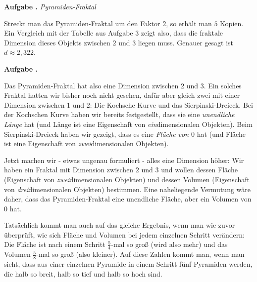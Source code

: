 \documentclass[a4paper,ngerman,12pt]{scrartcl}
\theoremstyle{definition}
\theoremstyle{plain}
\theoremstyle{remark}
\newlength{\aufgabenskip}
\newcounter{aufgabennummer}
\newenvironment{aufgabe}[1]{
  \addtocounter{aufgabennummer}{1}
  \textbf{Aufgabe \theaufgabennummer.} \emph{#1} \par
}{\vspace{\aufgabenskip}}
\begin{document}
\begin{aufgabe}{Pyramiden-Fraktal}
	Streckt man das Pyramiden-Fraktal um den Faktor $2$, so erhält man $5$ Kopien. Ein Vergleich mit der Tabelle aus Aufgabe 3 zeigt also, dass die fraktale Dimension dieses Objekts zwischen $2$ und $3$ liegen muss. Genauer gesagt ist $d \approx 2,322$.
\end{aufgabe}
	
\begin{aufgabe}{}
	Das Pyramiden-Fraktal hat also eine Dimension zwischen $2$ und $3$. Ein solches Fraktal hatten wir bisher noch nicht gesehen, dafür aber gleich zwei mit einer Dimension zwischen $1$ und $2$: Die Kochsche Kurve und das Sierpinski-Dreieck. Bei der Kochschen Kurve haben wir bereits festgestellt, dass sie eine \emph{unendliche Länge} hat (und Länge ist eine Eigenschaft von \emph{ein}dimensionalen Objekten). Beim Sierpinski-Dreieck haben wir gezeigt, dass es eine \emph{Fläche von $0$} hat (und Fläche ist eine Eigenschaft von \emph{zwei}dimensionalen Objekten).
	
	Jetzt machen wir - etwas ungenau formuliert - \glqq alles eine Dimension höher\grqq: Wir haben ein Fraktal mit Dimension zwischen $2$ und $3$ und wollen dessen Fläche (Eigenschaft von \emph{zwei}dimensionalen Objekten) und dessen Volumen (Eigenschaft von \emph{drei}dimensionalen Objekten) bestimmen. Eine naheliegende Vermutung wäre daher, dass das Pyramiden-Fraktal eine unendliche Fläche, aber ein Volumen von $0$ hat.
	
	Tatsächlich kommt man auch auf das gleiche Ergebnis, wenn man wie zuvor überprüft, wie sich Fläche und Volumen bei jedem einzelnen Schritt verändern:
	Die Fläche ist nach einem Schritt $\frac{5}{4}$-mal so groß (wird also mehr) und das Volumen $\frac{5}{8}$-mal so groß (also kleiner). Auf diese Zahlen kommt man, wenn man sieht, dass aus einer einzelnen Pyramide in einem Schritt fünf Pyramiden werden, die halb so breit, halb so tief und halb so hoch sind.
\end{aufgabe}
\end{document}
